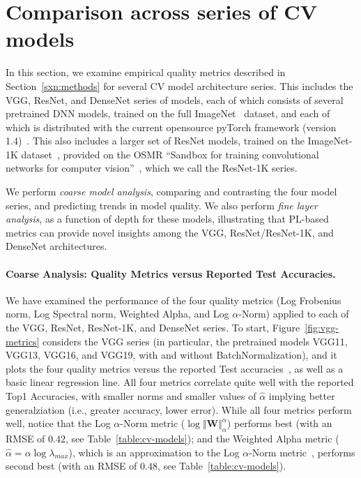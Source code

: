 \section{Comparison across series of CV models}
\label{sxn:cv}

In this section, we examine empirical quality metrics described in Section~\ref{sxn:methods} for several CV model architecture series.
This includes the VGG, ResNet, and DenseNet series of models, each of which consists of several pretrained DNN models, trained on the full ImageNet~\cite{imagenet} dataset, and each of which is distributed with the current opensource pyTorch framework (version 1.4)~\cite{pyTorch}.
This also includes a larger set of ResNet models, trained on the ImageNet-1K dataset~\cite{imagenet1k}, provided on the OSMR ``Sandbox for training convolutional networks for computer vision''~\cite{osmr}, which we call the ResNet-1K series.

We perform \emph{coarse model analysis}, comparing and contrasting the four model series, and predicting trends in model quality. 
We also perform \emph{fine layer analysis}, as a function of depth for these models, illustrating that PL-based metrics can provide novel insights among the VGG, ResNet/ResNet-1K, and DenseNet architectures. 

\paragraph{Coarse Analysis: Quality Metrics versus Reported Test Accuracies.}

We have examined the performance of the four quality metrics (Log Frobenius norm, Log Spectral norm, Weighted Alpha, and Log $\alpha$-Norm) applied to each of the VGG, ResNet, ResNet-1K, and DenseNet series.
To start, Figure~\ref{fig:vgg-metrics} considers the VGG series (in particular, the pretrained models VGG11, VGG13, VGG16, and VGG19, with and without BatchNormalization), and it plots the four quality metrics versus the reported Test accuracies~\cite{pyTorchVgg}, as well as a basic linear regression line. 
All four metrics correlate quite well with the reported Top1 Accuracies, with smaller norms and smaller values of $\hat{\alpha}$ implying better generalziation (i.e., greater accuracy, lower error). 
While all four metrics perform well, notice that the Log $\alpha$-Norm metric ($\log\Vert\mathbf{W}\Vert_{\alpha}^{\alpha}$) performs best (with an RMSE of $0.42$, see Table~\ref{table:cv-models}); and the Weighted Alpha metric ($\hat\alpha =\alpha\log\lambda_{max} $), which is an approximation to the Log $\alpha$-Norm metric~\cite{MM20_unpub_work}, performs second best (with an RMSE of $0.48$, see Table~\ref{table:cv-models}).

